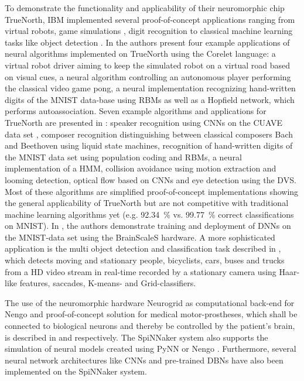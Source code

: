 To demonstrate the functionality and applicability of their neuromorphic chip TrueNorth, IBM implemented several proof-of-concept applications ranging from virtual robots, game simulations \cite{Arthur2012}, digit recognition \cite{Arthur2012, Esser2013} to classical machine learning tasks like object detection \cite{Akopyan2015}.
In \cite{Arthur2012} the authors present four example applications of neural algorithms implemented on TrueNorth using the Corelet language: a virtual robot driver aiming to keep the simulated robot on a virtual road based on visual cues, a neural algorithm controlling an autonomous player performing the classical video game pong, a neural implementation recognizing hand-written digits of the \ac{MNIST} data-base using \acp{RBM} as well as a Hopfield network, which performs autoassociation.
Seven example algorithms and applications for TrueNorth are presented in \cite{Esser2013}: speaker recognition using \acp{CNN} on the \ac{CUAVE} data set \cite{Patterson2002}, composer recognition distinguishing between classical composers Bach and Beethoven using liquid state machines, recognition of hand-written digits of the \ac{MNIST} data set using population coding and \acp{RBM}, a neural implementation of a \ac{HMM}, collision avoidance using motion extraction and looming detection, optical flow based on \acp{CNN} and eye detection using the \ac{DVS}.
Most of these algorithms are simplified proof-of-concept implementations showing the general applicability of TrueNorth but are not competitive with traditional machine learning algorithms yet (e.g. \SI{92.34}{\percent} \cite{Esser2013} vs. \SI{99.77}{\percent} \cite{Ciresan2012a} correct classifications on \ac{MNIST}).
In \cite{Schmitt2017}, the authors demonstrate training and deployment of \acp{DNN} on the \ac{MNIST}-data set using the \ac{BrainScaleS} hardware.
A more sophisticated application is the multi object detection and classification task described in \cite{Akopyan2015}, which detects moving and stationary people, bicyclists, cars, buses and trucks from a HD video stream in real-time recorded by a stationary camera using Haar-like features, saccades, K-means- and Grid-classifiers.

The use of the neuromorphic hardware Neurogrid \cite{Benjamin2014} as computational back-end for \ac{Nengo} and proof-of-concept solution for medical motor-prostheses, which shall be connected to biological neurons and thereby be controlled by the patient's brain, is described in \cite{Choudhary2012} and \cite{Dethier2011} respectively.
The \ac{SpiNNaker} system \cite{Furber2014} also supports the simulation of neural models created using \ac{PyNN} or \ac{Nengo} \cite{Mundy2015}.
Furthermore, several neural network architectures like \acp{CNN} \cite{Serrano-Gotarredona2015} and pre-trained \acp{DBN} \cite{Stromatias2015, Stromatias2015a} have also been implemented on the \ac{SpiNNaker} system.

